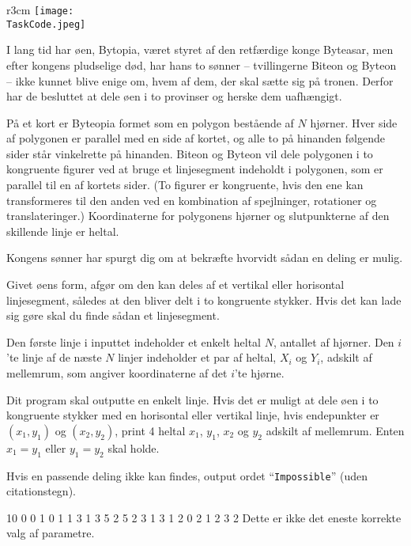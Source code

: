\documentclass{boi2014-dk}
\renewcommand{\TaskCode}{demarcation}
\newcommand{\constant}[1]{{\tt #1}}
\begin{document}
    \begin{wrapfigure}{r}{3cm}
        \vspace{-24pt}
		\texttt{[image: \\TaskCode.jpeg]}
	\end{wrapfigure}

    I lang tid har øen, Bytopia, været styret af den retfærdige konge Byteasar,
    men efter kongens pludselige død, har hans to sønner -- tvillingerne Biteon
    og Byteon -- ikke kunnet blive enige om, hvem af dem, der skal sætte sig på
    tronen. Derfor har de besluttet at dele øen i to provinser og herske dem
    uafhængigt.

    På et kort er Byteopia formet som en polygon bestående af $N$ hjørner. Hver
    side af polygonen er parallel med en side af kortet, og alle to på hinanden
    følgende sider står vinkelrette på hinanden. Biteon og Byteon vil dele
    polygonen i to kongruente figurer ved at bruge et linjesegment indeholdt i
    polygonen, som er parallel til en af kortets sider. (To figurer er
    kongruente, hvis den ene kan transformeres til den anden ved en kombination
    af spejlninger, rotationer og translateringer.) Koordinaterne for
    polygonens hjørner og slutpunkterne af den skillende linje er heltal.

    Kongens sønner har spurgt dig om at bekræfte hvorvidt sådan en deling er
    mulig.

    \Task

    Givet øens form, afgør om den kan deles af et vertikal eller horisontal
    linjesegment, således at den bliver delt i to kongruente stykker. Hvis det kan
    lade sig gøre skal du finde sådan et linjesegment.

    \Input
    Den første linje i inputtet indeholder et enkelt heltal $N$, antallet af
    hjørner. Den $i$'te linje af de næste $N$ linjer indeholder et par af
    heltal, $X_i$ og $Y_i$, adskilt af mellemrum, som angiver koordinaterne af
    det $i$'te hjørne.

	\Output
    Dit program skal outputte en enkelt linje. Hvis det er muligt at dele øen i
    to kongruente stykker med en horisontal eller vertikal linje, hvis
    endepunkter er $(x_1,y_1)$ og $(x_2,y_2)$, print 4 heltal $x_1$, $y_1$,
    $x_2$ og $y_2$ adskilt af mellemrum. Enten $x_1 = y_1$ eller $y_1 = y_2$
    skal holde.

    Hvis en passende deling ikke kan findes, output ordet
    ``\constant{Impossible}'' (uden citationstegn).

    \Examples
	\example
	{
		10
		0 0
		1 0
		1 1
		3 1
		3 5
		2 5
		2 3
		1 3
		1 2
		0 2
	}
	{
		1 2 3 2
	}
	{
        Dette er ikke det eneste korrekte valg af parametre.
	}
\end{document}
